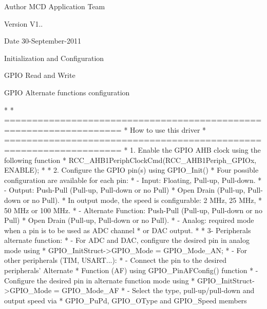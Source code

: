 \begin{DoxyAuthor}{Author}
M\+CD Application Team 
\end{DoxyAuthor}
\begin{DoxyVersion}{Version}
V1.. 
\end{DoxyVersion}
\begin{DoxyDate}{Date}
30-\/\+September-\/2011
\begin{DoxyItemize}
\item Initialization and Configuration
\item G\+P\+IO Read and Write
\item G\+P\+IO Alternate functions configuration
\end{DoxyItemize}
\end{DoxyDate}
\begin{DoxyVerb}*
*          ===================================================================
*                                 How to use this driver
*          ===================================================================       
*           1. Enable the GPIO AHB clock using the following function
*                RCC_AHB1PeriphClockCmd(RCC_AHB1Periph_GPIOx, ENABLE);
*             
*           2. Configure the GPIO pin(s) using GPIO_Init()
*              Four possible configuration are available for each pin:
*                - Input: Floating, Pull-up, Pull-down.
*                - Output: Push-Pull (Pull-up, Pull-down or no Pull)
*                          Open Drain (Pull-up, Pull-down or no Pull).
*                  In output mode, the speed is configurable: 2 MHz, 25 MHz,
*                  50 MHz or 100 MHz.
*                - Alternate Function: Push-Pull (Pull-up, Pull-down or no Pull)
*                                      Open Drain (Pull-up, Pull-down or no Pull).
*                - Analog: required mode when a pin is to be used as ADC channel
*                          or DAC output.
* 
*          3- Peripherals alternate function:
*              - For ADC and DAC, configure the desired pin in analog mode using 
*                  GPIO_InitStruct->GPIO_Mode = GPIO_Mode_AN;
*              - For other peripherals (TIM, USART...):
*                 - Connect the pin to the desired peripherals' Alternate 
*                   Function (AF) using GPIO_PinAFConfig() function
*                 - Configure the desired pin in alternate function mode using
*                   GPIO_InitStruct->GPIO_Mode = GPIO_Mode_AF
*                 - Select the type, pull-up/pull-down and output speed via 
*                   GPIO_PuPd, GPIO_OType and GPIO_Speed members

\end{DoxyVerb}
